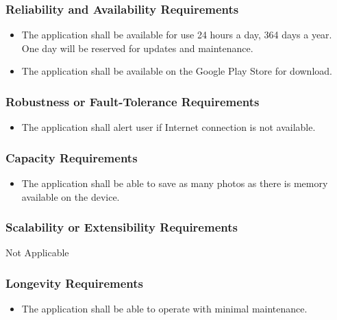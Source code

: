 \documentclass[]{article}
\begin{document}
\subsubsection{Reliability and Availability Requirements}
\label{ssub:reliability_and_availability_requirements}
\begin{itemize}
	\item The application shall be available for use 24 hours a day, 364 days a year. One day will be reserved for updates and maintenance. 
	\item The application shall be available on the Google Play Store for download.
\end{itemize}
	


\subsubsection{Robustness or Fault-Tolerance Requirements}
\label{ssub:robustness_or_fault_tolerance_requirements}
\begin{itemize}
	\item The application shall alert user if Internet connection is not available.
\end{itemize}

\subsubsection{Capacity Requirements}
\label{ssub:capacity_requirements}
\begin{itemize}
	\item The application shall be able to save as many photos as there is memory available on the device.
\end{itemize}

\subsubsection{Scalability or Extensibility Requirements}
\label{ssub:scalability_or_extensibility_requirements}

Not Applicable


\subsubsection{Longevity Requirements}
\label{ssub:longevity_requirements}
\begin{itemize}
	\item The application shall be able to operate with minimal maintenance.
\end{itemize}
\end{document}
